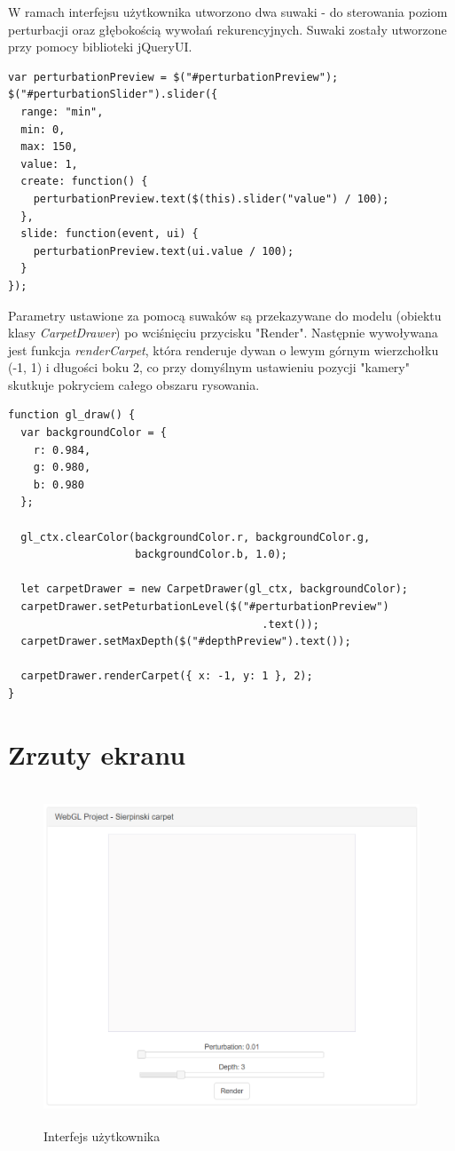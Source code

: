 \documentclass[a4paper,11pt]{article}
\begin{document}
W ramach interfejsu użytkownika utworzono dwa suwaki - do sterowania poziom perturbacji oraz głębokością wywołań rekurencyjnych. Suwaki zostały utworzone przy pomocy biblioteki jQueryUI. 

\begin{lstlisting}[caption=Utworzenie suwaka dla zmian poziomu perturbacji]
var perturbationPreview = $("#perturbationPreview");
$("#perturbationSlider").slider({
  range: "min",
  min: 0,
  max: 150,
  value: 1,
  create: function() {
    perturbationPreview.text($(this).slider("value") / 100);
  },
  slide: function(event, ui) {
    perturbationPreview.text(ui.value / 100);
  }
});
\end{lstlisting}

Parametry ustawione za pomocą suwaków są przekazywane do modelu (obiektu klasy \textit{CarpetDrawer}) po wciśnięciu przycisku "Render". Następnie wywoływana jest funkcja \textit{renderCarpet}, która renderuje dywan o lewym górnym wierzchołku (-1, 1) i długości boku 2, co przy domyślnym ustawieniu pozycji "kamery" skutkuje pokryciem całego obszaru rysowania.

\begin{lstlisting}[caption=Metoda wywołująca się przy nacisnięciu przycisku "Render"]
function gl_draw() {
  var backgroundColor = {
    r: 0.984,
    g: 0.980,
    b: 0.980
  };

  gl_ctx.clearColor(backgroundColor.r, backgroundColor.g, 
					backgroundColor.b, 1.0);

  let carpetDrawer = new CarpetDrawer(gl_ctx, backgroundColor);
  carpetDrawer.setPeturbationLevel($("#perturbationPreview")
										.text());
  carpetDrawer.setMaxDepth($("#depthPreview").text());

  carpetDrawer.renderCarpet({ x: -1, y: 1 }, 2);
}
\end{lstlisting}


\section{Zrzuty ekranu}

\begin{figure}[H]
\centering
 \includegraphics[height=10cm]{sierp.PNG}
\caption{Interfejs użytkownika}
\end{figure}
\end{document}
